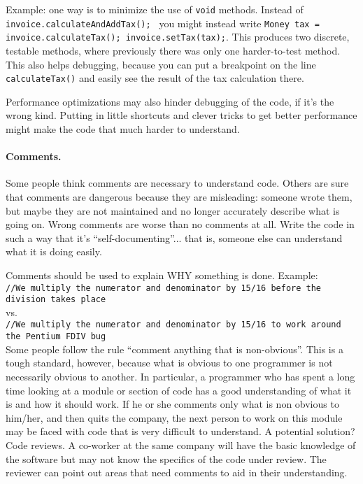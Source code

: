 Example: one way is to minimize the use of \texttt{void} methods. Instead of \texttt{invoice.calculateAndAddTax(); } you might instead write \texttt{Money tax = invoice.calculateTax(); invoice.setTax(tax);}. This produces two discrete, testable methods, where previously there was only one harder-to-test method. This also helps debugging, because you can put a breakpoint on the line \texttt{calculateTax()} and easily see the result of the tax calculation there.

Performance optimizations may also hinder debugging of the code, if it's the wrong kind. Putting in little shortcuts and clever tricks to get better performance might make the code that much harder to understand.

\paragraph{Comments.} Some people think comments are necessary to understand code. Others are sure that comments are dangerous because they are misleading: someone wrote them, but maybe they are not maintained and no longer accurately describe what is going on. Wrong comments are worse than no comments at all. Write the code in such a way that it's ``self-documenting''... that is, someone else can understand what it is doing easily.

Comments should be used to explain WHY something is done. Example:\\
\texttt{//We multiply the numerator and denominator by 15/16 before the division takes place}\\
vs.\\
\texttt{//We multiply the numerator and denominator by 15/16 to work around the Pentium FDIV bug}\\

Some people follow the rule ``comment anything that is non-obvious''. This is a tough standard, however, because what is obvious to one programmer is not necessarily obvious to another. In particular, a programmer who has spent a long time looking at a module or section of code has a good understanding of what it is and how it should work. If he or she comments only what is non obvious to him/her, and then quits the company, the next person to work on this module may be faced with code that is very difficult to understand. A potential solution? Code reviews. A co-worker at the same company will have the basic knowledge of the software but may not know the specifics of the code under review. The reviewer can point out areas that need comments to aid in their understanding.

